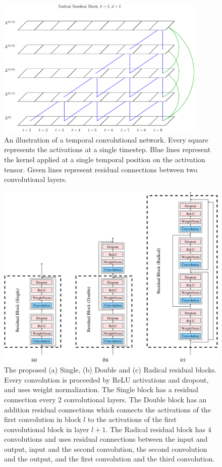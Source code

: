 \documentclass[a4paper, twoside]{article}
\begin{document}
\begin{figure}%
\begin{center}
    \includegraphics[width=10cm]{figRadical.eps}\caption{An illustration of a temporal convolutional network. Every square represents the activations at a single timestep. Blue lines represent the kernel applied at a single temporal position on the activation tensor. Green lines represent residual connections between two convolutional layers.}\label{figTCNRadical}
\end{center}
\end{figure}

\begin{figure}%
\begin{center}
    \includegraphics[width=16cm]{figGraph.eps}\caption{The proposed (a) Single, (b) Double and (c) Radical residual blocks. Every convolution is proceeded by ReLU activations and dropout, and uses weight normalization. The Single block has a residual connection every 2 convolutional layers. The Double block has an addition residual connections which connects the activations of the first convolution in block $l$ to the activations of the first convolutional block in layer $l+1$. The Radical residual block has 4 convolutions and uses residual connections between the input and output, input and the second convolution, the second convolution and the output, and the first convolution and the third convolution.}\label{figTCNGraph}
\end{center}
\end{figure}
\end{document}
